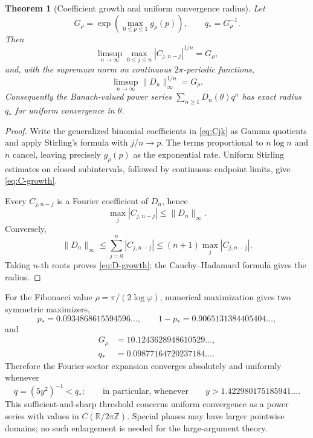 \documentclass[11pt,oneside]{article}
\numberwithin{equation}{section}
\theoremstyle{plain}
\newtheorem{theorem}{Theorem}[section]
\theoremstyle{definition}
\theoremstyle{remark}
\newcommand{\R}{\mathbb R}
\begin{document}
\begin{theorem}[Coefficient growth and uniform convergence radius]\label{thm:uniform-radius}
Let
\begin{equation}\label{eq:Gstar-qstar}
 G_\rho=\exp\!\left(\max_{0\le p\le1}g_\rho(p)\right),
 \qquad q_*=G_\rho^{-1}.
\end{equation}
Then
\begin{equation}\label{eq:C-growth}
 \limsup_{n\to\infty}
 \max_{0\le j\le n}|C_{j,n-j}|^{1/n}=G_\rho,
\end{equation}
and, with the supremum norm on continuous \(2\pi\)-periodic functions,
\begin{equation}\label{eq:D-growth}
 \limsup_{n\to\infty}\|D_n\|_\infty^{1/n}=G_\rho.
\end{equation}
Consequently the Banach-valued power series
\(\sum_{n\ge1}D_n(\theta)q^n\) has exact radius \(q_*\) for uniform
convergence in \(\theta\).
\end{theorem}

\begin{proof}
Write the generalized binomial coefficients in \cref{eq:Cjk} as Gamma
quotients and apply Stirling's formula with \(j/n\to p\).  The terms
proportional to \(n\log n\) and \(n\) cancel, leaving precisely
\(g_\rho(p)\) as the exponential rate.  Uniform Stirling estimates on
closed subintervals, followed by continuous endpoint limits, give
\cref{eq:C-growth}.

Every \(C_{j,n-j}\) is a Fourier coefficient of \(D_n\), hence
\[
 \max_j|C_{j,n-j}|\le\|D_n\|_\infty.
\]
Conversely,
\[
 \|D_n\|_\infty
 \le\sum_{j=0}^n|C_{j,n-j}|
 \le(n+1)\max_j|C_{j,n-j}|.
\]
Taking \(n\)-th roots proves \cref{eq:D-growth}; the Cauchy--Hadamard
formula gives the radius.
\end{proof}

For the Fibonacci value \(\rho=\pi/(2\log\varphi)\), numerical maximization
gives two symmetric maximizers,
\begin{equation}\label{eq:pstar-numeric}
 p_*=0.0934868615594596\ldots,
 \qquad 1-p_*=0.9065131384405404\ldots,
\end{equation}
and
\begin{align}
 G_\rho&=10.1243628948610529\ldots,
 \label{eq:G-numeric}\\
 q_*&=0.09877164720237184\ldots.
 \label{eq:qstar-numeric}
\end{align}
Therefore the Fourier-sector expansion converges absolutely and uniformly
whenever
\begin{equation}\label{eq:y-uniform-threshold}
 q=(5y^2)^{-1}<q_*;
 \qquad\text{in particular, whenever}\qquad
 y>1.422980175185941\ldots.
\end{equation}
This sufficient-and-sharp threshold concerns uniform convergence as a
power series with values in \(C(\R/2\pi\mathbb Z)\).  Special phases may
have larger pointwise domains; no such enlargement is needed for the
large-argument theory.
\end{document}
